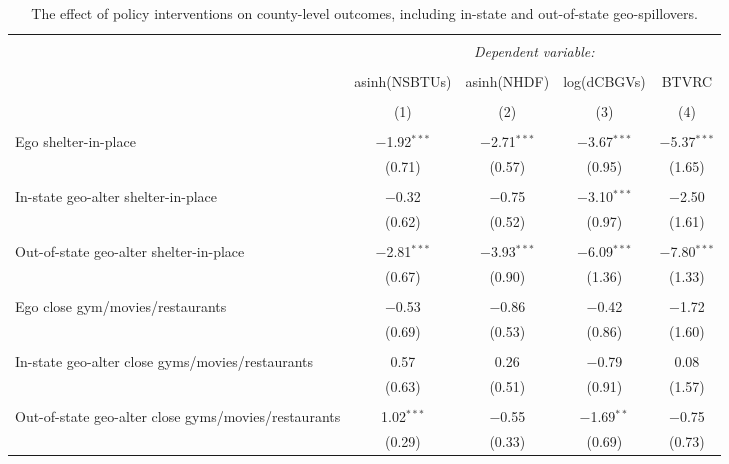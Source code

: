 
\begin{table}[!htbp] \centering 
  \caption{The effect of policy interventions on county-level outcomes, including in-state and out-of-state geo-spillovers.} 
  \label{tab:diff_in_diff_geo_split_state} 
\footnotesize 
\begin{tabular}{@{\extracolsep{5pt}}lcccc} 
\\[-1.8ex]\hline 
\hline \\[-1.8ex] 
 & \multicolumn{4}{c}{\textit{Dependent variable:}} \\ 
\cline{2-5} 
\\[-1.8ex] & asinh(NSBTUs) & asinh(NHDF) & log(dCBGVs) & BTVRC \\ 
\\[-1.8ex] & (1) & (2) & (3) & (4)\\ 
\hline \\[-1.8ex] 
 Ego shelter-in-place & $-$1.92$^{***}$ & $-$2.71$^{***}$ & $-$3.67$^{***}$ & $-$5.37$^{***}$ \\ 
  & (0.71) & (0.57) & (0.95) & (1.65) \\ 
  & & & & \\ 
 In-state geo-alter shelter-in-place & $-$0.32 & $-$0.75 & $-$3.10$^{***}$ & $-$2.50 \\ 
  & (0.62) & (0.52) & (0.97) & (1.61) \\ 
  & & & & \\ 
 Out-of-state geo-alter shelter-in-place & $-$2.81$^{***}$ & $-$3.93$^{***}$ & $-$6.09$^{***}$ & $-$7.80$^{***}$ \\ 
  & (0.67) & (0.90) & (1.36) & (1.33) \\ 
  & & & & \\ 
 Ego close gym/movies/restaurants & $-$0.53 & $-$0.86 & $-$0.42 & $-$1.72 \\ 
  & (0.69) & (0.53) & (0.86) & (1.60) \\ 
  & & & & \\ 
 In-state geo-alter close gyms/movies/restaurants & 0.57 & 0.26 & $-$0.79 & 0.08 \\ 
  & (0.63) & (0.51) & (0.91) & (1.57) \\ 
  & & & & \\ 
 Out-of-state geo-alter close gyms/movies/restaurants & 1.02$^{***}$ & $-$0.55 & $-$1.69$^{**}$ & $-$0.75 \\ 
  & (0.29) & (0.33) & (0.69) & (0.73) \\ 

\end{tabular}
\end{table}
